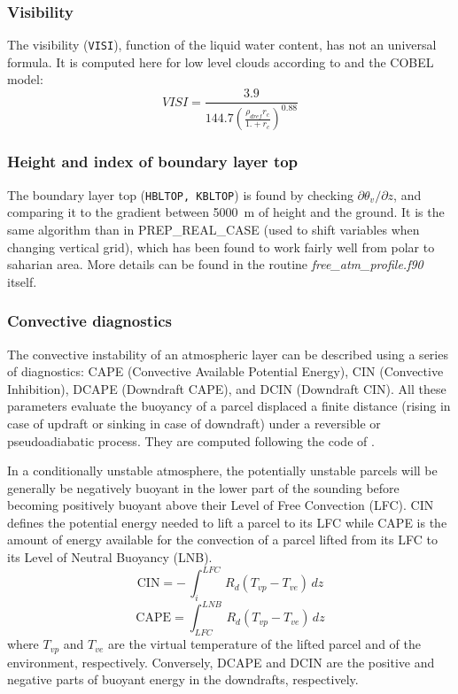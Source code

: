 \subsubsection{Visibility}
The visibility ({\tt VISI}), function of the liquid water content, has not an universal formula.
It is computed here for low level clouds according to \citet{Kunkel1984}
and the COBEL model:
\begin{equation}
VISI=\frac{3.9}{144.7(\frac{\rho_{dref}r_c}{1.+r_c})^{0.88}}
\end{equation}

\subsubsection{Height and index of boundary layer top}
The boundary layer top  ({\tt HBLTOP, KBLTOP}) is found by checking 
$\partial\theta_v/\partial z$, and comparing it to the gradient
between 5000~m of
height and the ground. It is the same algorithm than in PREP\_REAL\_CASE (used
to shift variables when changing vertical grid), which has been found to work 
fairly well from polar to saharian area. More details can be found in the 
routine {\it free\_atm\_profile.f90} itself.

\subsubsection{Convective diagnostics}
The convective instability of an atmospheric layer can be described using a series of diagnostics: CAPE (Convective Available Potential Energy), CIN (Convective Inhibition), DCAPE (Downdraft CAPE), and DCIN (Downdraft CIN). All these parameters evaluate the buoyancy of a parcel displaced a finite distance (rising in case of updraft or sinking in case of downdraft) under a reversible or pseudoadiabatic process. They are computed following the code of \citet{Emanuel1994}.

In a conditionally unstable atmosphere, the potentially unstable parcels will be generally be negatively buoyant in the lower part of the sounding before becoming positively buoyant above their Level of Free Convection (LFC). CIN defines the potential energy needed to lift a parcel to its LFC while CAPE is the amount of energy available for the convection of a parcel lifted from its LFC to its Level of Neutral Buoyancy (LNB). 
\begin{equation}
\mbox{CIN}= - \, \int_{i}^{LFC} \, R_d ( T_{vp} - T_{ve}) \, dz
\end{equation}
\begin{equation}
\mbox{CAPE}=\int_{LFC}^{LNB} \, R_d ( T_{vp} - T_{ve}) \, dz
\end{equation}
where $T_{vp}$ and $T_{ve}$ are the virtual temperature of the lifted parcel and of the environment, respectively. Conversely, DCAPE and DCIN are the positive and negative parts of buoyant energy in the downdrafts, respectively.
%
